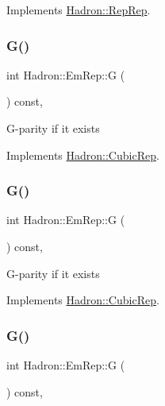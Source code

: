 Implements \mbox{\hyperlink{structHadron_1_1RepRep_a92c8802e5ed7afd7da43ccfd5b7cd92b}{Hadron\+::\+Rep\+Rep}}.

\mbox{\label{structHadron_1_1EmRep_aaed5af7f3ec6657d7a9f34e4c016182d}} 
\subsubsection{\texorpdfstring{G()}{G()}\hspace{0.1cm}{\footnotesize\ttfamily [1/3]}}
{\footnotesize\ttfamily int Hadron\+::\+Em\+Rep\+::G (\begin{DoxyParamCaption}{ }\end{DoxyParamCaption}) const\hspace{0.3cm}{\ttfamily [inline]}, {\ttfamily [virtual]}}

G-\/parity if it exists 

Implements \mbox{\hyperlink{structHadron_1_1CubicRep_a52104e43266d1614c00bbd1c3b395458}{Hadron\+::\+Cubic\+Rep}}.

\mbox{\label{structHadron_1_1EmRep_aaed5af7f3ec6657d7a9f34e4c016182d}} 
\subsubsection{\texorpdfstring{G()}{G()}\hspace{0.1cm}{\footnotesize\ttfamily [2/3]}}
{\footnotesize\ttfamily int Hadron\+::\+Em\+Rep\+::G (\begin{DoxyParamCaption}{ }\end{DoxyParamCaption}) const\hspace{0.3cm}{\ttfamily [inline]}, {\ttfamily [virtual]}}

G-\/parity if it exists 

Implements \mbox{\hyperlink{structHadron_1_1CubicRep_a52104e43266d1614c00bbd1c3b395458}{Hadron\+::\+Cubic\+Rep}}.

\mbox{\label{structHadron_1_1EmRep_aaed5af7f3ec6657d7a9f34e4c016182d}} 
\subsubsection{\texorpdfstring{G()}{G()}\hspace{0.1cm}{\footnotesize\ttfamily [3/3]}}
{\footnotesize\ttfamily int Hadron\+::\+Em\+Rep\+::G (\begin{DoxyParamCaption}{ }\end{DoxyParamCaption}) const\hspace{0.3cm}{\ttfamily [inline]}, {\ttfamily [virtual]}}

